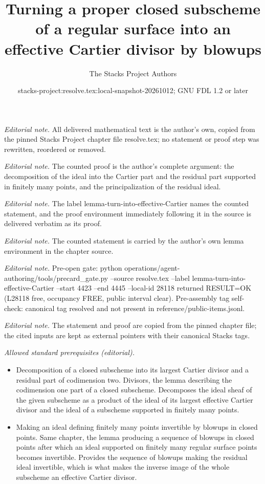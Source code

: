 \documentclass[10pt,a4paper]{amsart}
\title{Turning a proper closed subscheme of a regular surface into an effective Cartier divisor by blowups}
\author{The Stacks Project Authors}
\date{stacks-project:resolve.tex:local-snapshot-20261012; GNU FDL 1.2 or later}
\theoremstyle{plain}
\theoremstyle{definition}
\theoremstyle{remark}
\numberwithin{equation}{subsection}
\begin{document}
\maketitle
\noindent\textit{Editorial note.} All delivered mathematical text is the author's own, copied from the pinned Stacks Project chapter file resolve.tex; no statement or proof step was rewritten, reordered or removed.\par\medskip
\noindent\textit{Editorial note.} The counted proof is the author's complete argument: the decomposition of the ideal into the Cartier part and the residual part supported in finitely many points, and the principalization of the residual ideal.\par\medskip
\noindent\textit{Editorial note.} The label lemma-turn-into-effective-Cartier names the counted statement, and the proof environment immediately following it in the source is delivered verbatim as its proof.\par\medskip
\noindent\textit{Editorial note.} The counted statement is carried by the author's own lemma environment in the chapter source.\par\medskip
\noindent\textit{Editorial note.} Pre-open gate: python operations/agent-authoring/tools/precard\_gate.py --source resolve.tex --label lemma-turn-into-effective-Cartier --start 4423 --end 4445 --local-id 28118 returned RESULT=OK (L28118 free, occupancy FREE, public interval clear). Pre-assembly tag self-check: canonical tag resolved and not present in reference/public-items.jsonl.\par\medskip
\noindent\textit{Editorial note.} The statement and proof are copied from the pinned chapter file; the cited inputs are kept as external pointers with their canonical Stacks tags.\par\medskip
\noindent\textit{Allowed standard prerequisites (editorial).}\begin{itemize}
\item Decomposition of a closed subscheme into its largest Cartier divisor and a residual part of codimension two. Divisors, the lemma describing the codimension one part of a closed subscheme. Decomposes the ideal sheaf of the given subscheme as a product of the ideal of its largest effective Cartier divisor and the ideal of a subscheme supported in finitely many points.
\item Making an ideal defining finitely many points invertible by blowups in closed points. Same chapter, the lemma producing a sequence of blowups in closed points after which an ideal supported on finitely many regular surface points becomes invertible. Provides the sequence of blowups making the residual ideal invertible, which is what makes the inverse image of the whole subscheme an effective Cartier divisor.
\end{itemize}\medskip
\end{document}
